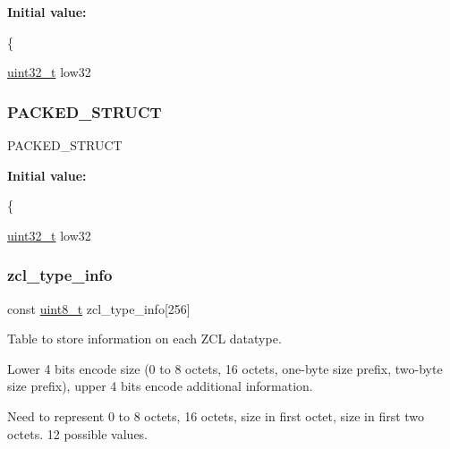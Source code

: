 {\bfseries Initial value\+:}
\begin{DoxyCode}
\{

         \hyperlink{group__hal__dos_ga09a1e304d66d35dd47daffee9731edaa}{uint32\_t}  low32
\end{DoxyCode}
\mbox{\label{group__zcl__types_ga5d86508e715769ce35a4845ed5f8f252}} 
\subsubsection{\texorpdfstring{P\+A\+C\+K\+E\+D\+\_\+\+S\+T\+R\+U\+CT}{PACKED\_STRUCT}\hspace{0.1cm}{\footnotesize\ttfamily [2/2]}}
{\footnotesize\ttfamily P\+A\+C\+K\+E\+D\+\_\+\+S\+T\+R\+U\+CT}

{\bfseries Initial value\+:}
\begin{DoxyCode}
\{

         \hyperlink{group__hal__dos_ga09a1e304d66d35dd47daffee9731edaa}{uint32\_t}  low32
\end{DoxyCode}
\mbox{\label{group__zcl__types_ga0f5737f60f1f37fb3b375e9fd5fe664d}} 
\subsubsection{\texorpdfstring{zcl\+\_\+type\+\_\+info}{zcl\_type\_info}\hspace{0.1cm}{\footnotesize\ttfamily [1/2]}}
{\footnotesize\ttfamily const \hyperlink{group__hal__dos_gae1affc9ca37cfb624959c866a73f83c2}{uint8\+\_\+t} zcl\+\_\+type\+\_\+info\mbox{[}256\mbox{]}}



Table to store information on each Z\+CL datatype. 

Lower 4 bits encode size (0 to 8 octets, 16 octets, one-\/byte size prefix, two-\/byte size prefix), upper 4 bits encode additional information.

Need to represent 0 to 8 octets, 16 octets, size in first octet, size in first two octets. 12 possible values.

